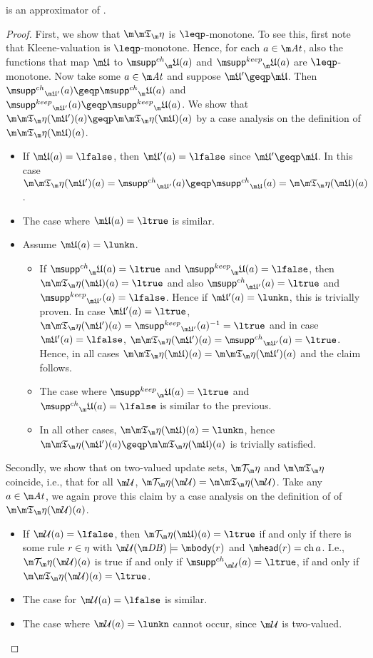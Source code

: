 \begin{proposition}
 \Ap is an approximator of \Op.
\end{proposition}
\begin{proof}
First, we show that $\Ap$ is $\leqp$-monotone. To see this, first note that Kleene-valuation is $\leqp$-monotone. Hence, for each $a\in \atoms$, also the functions that map $\UUU$ to $\suppin_\UUU(a)$ and $\suppout_\UUU(a)$ are $\leqp$-monotone. Now take some $a\in\atoms$ and suppose $\UUU'\geqp\UUU$. Then  $\suppin_{\UUU'}(a)\geqp \suppin_\UUU(a)$ and $\suppout_{\UUU'}(a)\geqp \suppout_\UUU(a)$. We show that $\Ap(\UUU')(a)\geqp \Ap(\UUU)(a)$ by a case analysis on the definition of $\Ap(\UUU)(a)$. 
\begin{itemize}
\item If $\UUU(a)=\lfalse$, then $\UUU'(a)=\lfalse$ since $\UUU'\geqp\UUU$. In this case $\Ap(\UUU')(a) = \suppin_{\UUU'}(a) \geqp \suppin_{\UUU}(a) =  \Ap(\UUU)(a)$. 
\item The case where $\UUU(a)=\ltrue$ is similar.
\item Assume $\UUU(a) = \lunkn$. 
\begin{itemize}
\item If $\suppin_\UUU(a) = \ltrue$ and $\suppout_\UUU(a)=\lfalse$, then $\Ap(\UUU)(a)=\ltrue$ and also $\suppin_{\UUU'}(a) = \ltrue$ and $\suppout_{\UUU'}(a)=\lfalse$. Hence if $\UUU'(a)=\lunkn$, this is trivially proven. In case $\UUU'(a)=\ltrue$, $\Ap(\UUU')(a) = \suppout_{\UUU'}(a)^{-1}=\ltrue$ and in case $\UUU'(a)=\lfalse$, $\Ap(\UUU')(a)= \suppin_{\UUU'}(a)= \ltrue$. Hence, in all cases $\Ap(\UUU)(a) = \Ap(\UUU')(a)$ and the claim follows.
\item The case where $\suppout_\UUU(a)=\ltrue$ and $\suppin_\UUU(a) = \lfalse$ is similar to the previous.
\item In all other cases, $\Ap(\UUU)(a)=\lunkn$, hence $\Ap(\UUU')(a)\geqp \Ap(\UUU)(a)$ is trivially satisfied.
\end{itemize}

\end{itemize}

Secondly, we show that on two-valued update sets, $\Op$ and $\Ap$ coincide, i.e., that for all $\UU$, $\Op(\UU) =  \Ap(\UU)$. Take any $a \in \atoms$, we again prove this claim by a case analysis on the definition of of $\Ap(\UU)(a)$.
\begin{itemize}
 \item If $\UU(a)=\lfalse$, then $\Op(\UUU)(a)= \ltrue$ if and only if there is some rule $r\in \eta$ with $\UU(\db) \models \body(r)$ and $\head(r)=\change a$. I.e., $\Op(\UU)(a)$ is true if and only if $\suppin_{\UU}(a) = \ltrue$, if and only if $\Ap(\UU)(a)=\ltrue$. 
 \item The case for $\UU(a)=\lfalse$ is similar. 
 \item The case where $\UU(a)= \lunkn$ cannot occur, since $\UU$ is two-valued. \qedhere
\end{itemize}
\end{proof}

